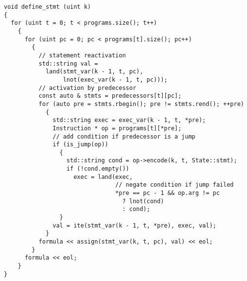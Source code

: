 \begin{lstlisting}[style=c++]
void define_stmt (uint k)
{
  for (uint t = 0; t < programs.size(); t++)
    {
      for (uint pc = 0; pc < programs[t].size(); pc++)
        {
          // statement reactivation
          std::string val =
            land(stmt_var(k - 1, t, pc),
                 lnot(exec_var(k - 1, t, pc)));
          // activation by predecessor
          const auto & stmts = predecessors[t][pc];
          for (auto pre = stmts.rbegin(); pre != stmts.rend(); ++pre)
            {
              std::string exec = exec_var(k - 1, t, *pre);
              Instruction * op = programs[t][*pre];
              // add condition if predecessor is a jump
              if (is_jump(op))
                {
                  std::string cond = op->encode(k, t, State::stmt);
                  if (!cond.empty())
                    exec = land(exec,
                                // negate condition if jump failed
                                *pre == pc - 1 && op.arg != pc
                                  ? lnot(cond)
                                  : cond);
                }
              val = ite(stmt_var(k - 1, t, *pre), exec, val);
            }
          formula << assign(stmt_var(k, t, pc), val) << eol;
        }
      formula << eol;
    }
}
\end{lstlisting}

